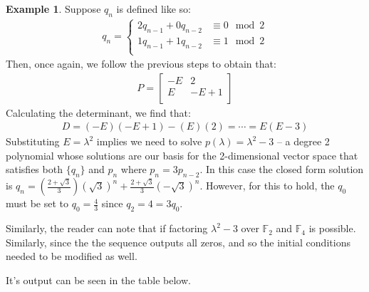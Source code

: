 \documentclass[a4paper]{article}
\theoremstyle{definition}
\newtheorem{example}{Example}[section]
\begin{document}
\begin{example}
Suppose $q_n$ is defined like so:
\begin{align*}
q_n=
\begin{cases}
2q_{n-1}+0q_{n-2} & \equiv 0 \mod 2 \\
1q_{n-1}+1q_{n-2} & \equiv 1 \mod 2 \\
\end{cases}
\end{align*}
Then, once again, we follow the previous steps to obtain that:
\begin{align*}
P=
\begin{bmatrix}
   -E &    2 \\
    E & -E+1 \\
\end{bmatrix}
\end{align*}
Calculating the determinant, we find that:
\begin{align*}
D=(-E)(-E+1)-(E)(2)=\cdots=E(E-3)
\end{align*}
Substituting $E=\lambda^2$ implies we need to solve $p(\lambda)=\lambda^2-3$ -- a degree 2 polynomial
whose solutions are our basis for the 2-dimensional vector space that satisfies both $\{q_n\}$ and
${p_n}$ where $p_n=3p_{n-2}$. In this case the closed form solution is
$q_n=\left(\frac{2+\sqrt{3}}{3}\right)(\sqrt{3})^n+\frac{2+\sqrt{3}}{3}(-\sqrt{3})^n$. However, for this
to hold, the $q_0$ must be set to $q_0=\frac{4}{3}$ since $q_2={4}=3q_0$. 

Similarly, the reader can note that if factoring $\lambda^2-3$ over $\mathbb{F}_2$ and $\mathbb{F}_4$ is
possible. Similarly, since the the sequence outputs all zeros, and so the initial conditions needed to
be modified as well. 

It's output can be seen in the table below.


\end{example}
\end{document}
